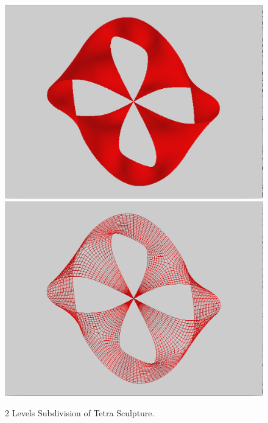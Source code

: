 \documentclass[12pt]{article}
\begin{document}
\begin{figure}[h!]
  \centering
    \includegraphics[width=\textwidth]{Tetra2}
    \includegraphics[width=\textwidth]{Tetra2w}
  \caption{2 Levels Subdivision of Tetra Sculpture.} \label{figure:Tetra2}
\end{figure}
\end{document}
